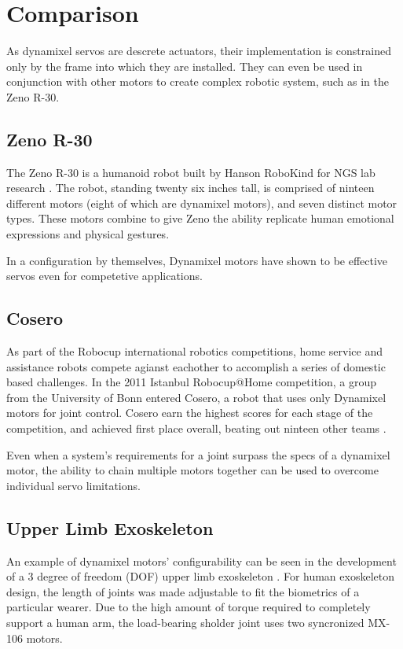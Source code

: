 \documentclass[10pt,journal]{IEEEtran}
\begin{document}
\section{Comparison} %
As dynamixel servos are descrete actuators, their implementation is constrained only by the frame into which they are installed. They can even be used in conjunction with other motors to create complex robotic system, such as in the Zeno R-30.

\subsection{Zeno R-30}
The Zeno R-30 is a humanoid robot built by Hanson RoboKind for NGS lab research \cite{wijayasinghe2016human}. The robot, standing twenty six inches tall, is comprised of ninteen different motors (eight of which are dynamixel motors), and seven distinct motor types. These motors combine to give Zeno the ability replicate human emotional expressions and physical gestures.

In a configuration by themselves, Dynamixel motors have shown to be effective servos even for competetive applications.

\subsection{Cosero}
As part of the Robocup international robotics competitions, home service and assistance robots compete agianst eachother to accomplish a series of domestic based challenges. In the 2011 Istanbul Robocup@Home competition, a group from the University of Bonn entered Cosero, a robot that uses only Dynamixel motors for joint control. Cosero earn the highest scores for each stage of the competition, and achieved first place overall, beating out ninteen other teams \cite{stuckler2012robocup}.

Even when a system's requirements for a joint surpass the specs of a dynamixel motor, the ability to chain multiple motors together can be used to overcome individual servo limitations.

\subsection{Upper Limb Exoskeleton}
An example of dynamixel motors' configurability can be seen in the development of a 3 degree of freedom (DOF) upper limb exoskeleton \cite{mahdavian2015design}. For human exoskeleton design, the length of joints was made adjustable to fit the biometrics of a particular wearer. Due to the high amount of torque required to completely support a human arm, the load-bearing sholder joint uses two syncronized MX-106 motors.
\end{document}
